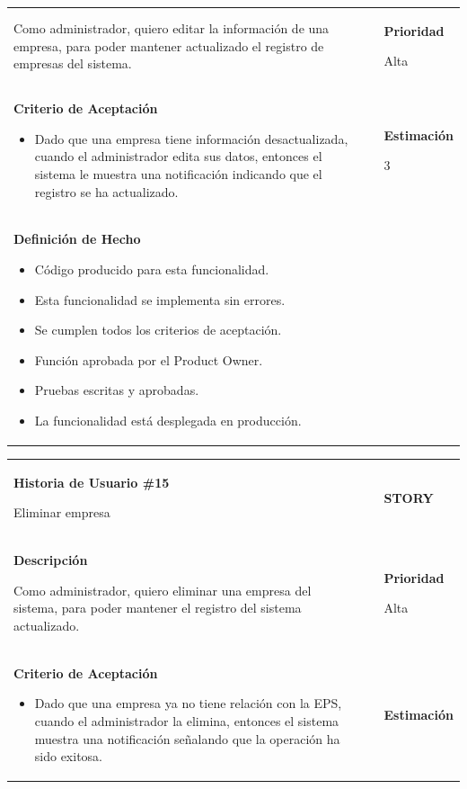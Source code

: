 \documentclass[12pt,a4paper]{article}
\begin{document}
\begin{center}
\begin{tabular}{| p{10cm} c p{2.5cm}|}
Como administrador, quiero editar la información de una empresa, para
poder mantener actualizado el registro de empresas del sistema. &  & \textbf{Prioridad}

Alta\\

\textbf{Criterio de Aceptación}

\begin{itemize}
\item Dado que una empresa tiene información desactualizada, cuando
el administrador edita sus datos, entonces el sistema le muestra
una notificación indicando que el registro se ha actualizado.
\end{itemize} & & \textbf{Estimación}

3 \\ 

\textbf{Definición de Hecho}

\begin{itemize}
\item Código producido para esta funcionalidad.
\item Esta funcionalidad se implementa sin errores.
\item Se cumplen todos los criterios de aceptación.
\item Función aprobada por el Product Owner.
\item Pruebas escritas y aprobadas.
\item La funcionalidad está desplegada en producción.
\end{itemize} & & \\
\hline  
\end{tabular}
\vspace{5mm}

\begin{tabular}{| p{10cm} c p{2.5cm}|}
\hline 
\textbf{Historia de Usuario \#15}

Eliminar empresa & & \textbf{{\Large STORY}} \\ 
\textbf{Descripción}

Como administrador, quiero eliminar una empresa del sistema, para
poder mantener el registro del sistema actualizado. &  & \textbf{Prioridad}

Alta\\

\textbf{Criterio de Aceptación}

\begin{itemize}
\item Dado que una empresa ya no tiene relación con la EPS, cuando el
administrador la elimina, entonces el sistema muestra una
notificación señalando que la operación ha sido exitosa.
\end{itemize} & & \textbf{Estimación}


\end{tabular}
\end{center}
\end{document}

